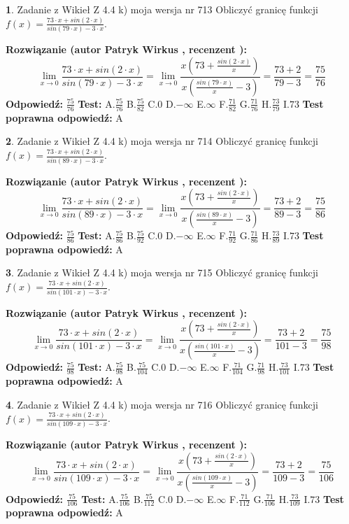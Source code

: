 \documentclass[12pt, a4paper]{article}
\theoremstyle{definition} %
\newtheorem{zad}{}
\newcommand{\zadStart}[1]{\begin{zad}#1\newline}
\newcommand{\zadStop}{\end{zad}}
\newcommand{\rozwStart}[2]{\noindent \textbf{Rozwiązanie (autor #1 , recenzent #2): }\newline}
\newcommand{\rozwStop}{\newline}
\newcommand{\odpStart}{\noindent \textbf{Odpowiedź:}\newline}
\newcommand{\odpStop}{\newline}
\newcommand{\testStart}{\noindent \textbf{Test:}\newline}
\newcommand{\testStop}{\newline}
\newcommand{\kluczStart}{\noindent \textbf{Test poprawna odpowiedź:}\newline}
\newcommand{\kluczStop}{\newline}
\begin{document}
\zadStart{Zadanie z Wikieł Z 4.4 k) moja wersja nr 713}
Obliczyć granicę funkcji $f(x)=\frac{73\cdot x +sin(2\cdot x)}{sin(79\cdot x) -3\cdot x}$.
\zadStop
\rozwStart{Patryk Wirkus}{}
$$\lim\limits_{x\to 0}\frac{73\cdot x +sin(2\cdot x)}{sin(79\cdot x) -3\cdot x}
=\lim\limits_{x\to 0}\frac{x(73+\frac{sin(2\cdot x)}{x})}{x(\frac{sin(79\cdot x)}{x}-3)}
=\frac{73+2}{79-3} = \frac{75}{76}$$
\rozwStop
\odpStart
$\frac{75}{76}$
\odpStop
\testStart
A.$\frac{75}{76}$
B.$\frac{75}{82}$
C.$0$
D.$-\infty$
E.$\infty$
F.$\frac{71}{82}$
G.$\frac{71}{76}$
H.$\frac{73}{79}$
I.$73$
\testStop
\kluczStart
A
\kluczStop



\zadStart{Zadanie z Wikieł Z 4.4 k) moja wersja nr 714}
Obliczyć granicę funkcji $f(x)=\frac{73\cdot x +sin(2\cdot x)}{sin(89\cdot x) -3\cdot x}$.
\zadStop
\rozwStart{Patryk Wirkus}{}
$$\lim\limits_{x\to 0}\frac{73\cdot x +sin(2\cdot x)}{sin(89\cdot x) -3\cdot x}
=\lim\limits_{x\to 0}\frac{x(73+\frac{sin(2\cdot x)}{x})}{x(\frac{sin(89\cdot x)}{x}-3)}
=\frac{73+2}{89-3} = \frac{75}{86}$$
\rozwStop
\odpStart
$\frac{75}{86}$
\odpStop
\testStart
A.$\frac{75}{86}$
B.$\frac{75}{92}$
C.$0$
D.$-\infty$
E.$\infty$
F.$\frac{71}{92}$
G.$\frac{71}{86}$
H.$\frac{73}{89}$
I.$73$
\testStop
\kluczStart
A
\kluczStop



\zadStart{Zadanie z Wikieł Z 4.4 k) moja wersja nr 715}
Obliczyć granicę funkcji $f(x)=\frac{73\cdot x +sin(2\cdot x)}{sin(101\cdot x) -3\cdot x}$.
\zadStop
\rozwStart{Patryk Wirkus}{}
$$\lim\limits_{x\to 0}\frac{73\cdot x +sin(2\cdot x)}{sin(101\cdot x) -3\cdot x}
=\lim\limits_{x\to 0}\frac{x(73+\frac{sin(2\cdot x)}{x})}{x(\frac{sin(101\cdot x)}{x}-3)}
=\frac{73+2}{101-3} = \frac{75}{98}$$
\rozwStop
\odpStart
$\frac{75}{98}$
\odpStop
\testStart
A.$\frac{75}{98}$
B.$\frac{75}{104}$
C.$0$
D.$-\infty$
E.$\infty$
F.$\frac{71}{104}$
G.$\frac{71}{98}$
H.$\frac{73}{101}$
I.$73$
\testStop
\kluczStart
A
\kluczStop



\zadStart{Zadanie z Wikieł Z 4.4 k) moja wersja nr 716}
Obliczyć granicę funkcji $f(x)=\frac{73\cdot x +sin(2\cdot x)}{sin(109\cdot x) -3\cdot x}$.
\zadStop
\rozwStart{Patryk Wirkus}{}
$$\lim\limits_{x\to 0}\frac{73\cdot x +sin(2\cdot x)}{sin(109\cdot x) -3\cdot x}
=\lim\limits_{x\to 0}\frac{x(73+\frac{sin(2\cdot x)}{x})}{x(\frac{sin(109\cdot x)}{x}-3)}
=\frac{73+2}{109-3} = \frac{75}{106}$$
\rozwStop
\odpStart
$\frac{75}{106}$
\odpStop
\testStart
A.$\frac{75}{106}$
B.$\frac{75}{112}$
C.$0$
D.$-\infty$
E.$\infty$
F.$\frac{71}{112}$
G.$\frac{71}{106}$
H.$\frac{73}{109}$
I.$73$
\testStop
\kluczStart
A
\kluczStop
\end{document}
